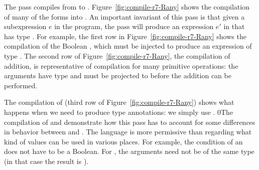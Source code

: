 \documentclass[7x10,nocrop]{TimesAPriori_MIT}%
\def\racketEd{0}
\def\edition{0}
\newcommand{\racket}[1]{{\if\edition\racketEd{#1}\fi}}
\begin{document}
The  pass compiles from \LangDyn{} to \LangAny{}.
Figure~\ref{fig:compile-r7-Rany} shows the compilation of many of the
\LangDyn{} forms into \LangAny{}. An important invariant of this pass is that
given a subexpression $e$ in the \LangDyn{} program, the pass will produce
an expression $e'$ in \LangAny{} that has type \ANYTY{}. For example, the
first row in Figure~\ref{fig:compile-r7-Rany} shows the compilation of
the Boolean \TRUE{}, which must be injected to produce an
expression of type \ANYTY{}.
%
The second row of Figure~\ref{fig:compile-r7-Rany}, the compilation of
addition, is representative of compilation for many primitive
operations: the arguments have type \ANYTY{} and must be projected to
\INTTYPE{} before the addition can be performed.

The compilation of  (third row of
Figure~\ref{fig:compile-r7-Rany}) shows what happens when we need to
produce type annotations: we simply use \ANYTY{}.
%
\racket{The compilation of  and   demonstrate how
  this pass has to account for some differences in behavior between
  \LangDyn{} and \LangAny{}. The \LangDyn{} language is more
  permissive than \LangAny{} regarding what kind of values can be used
  in various places. For example, the condition of an \key{if} does
  not have to be a Boolean. For \key{eq?}, the arguments need not be
  of the same type (in that case the result is \code{\#f}).}
\end{document}

